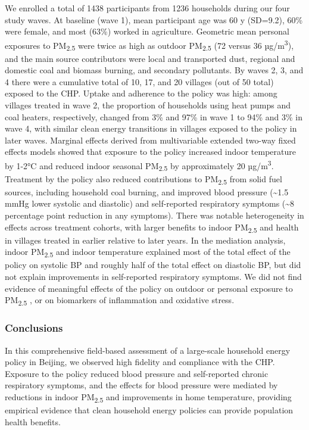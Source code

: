 \documentclass[
  letterpaper,
  DIV=11,
  numbers=noendperiod]{scrartcl}
\begin{document}
We enrolled a total of 1438 participants from 1236 households during our
four study waves. At baseline (wave 1), mean participant age was 60 y
(SD=9.2), 60\% were female, and most (63\%) worked in agriculture.
Geometric mean personal exposures to PM\textsubscript{2.5} were twice as
high as outdoor PM\textsubscript{2.5} (72 versus 36
µg/m\textsuperscript{3}), and the main source contributors were local
and transported dust, regional and domestic coal and biomass burning,
and secondary pollutants. By waves 2, 3, and 4 there were a cumulative
total of 10, 17, and 20 villages (out of 50 total) exposed to the CHP.
Uptake and adherence to the policy was high: among villages treated in
wave 2, the proportion of households using heat pumps and coal heaters,
respectively, changed from 3\% and 97\% in wave 1 to 94\% and 3\% in
wave 4, with similar clean energy transitions in villages exposed to the
policy in later waves. Marginal effects derived from multivariable
extended two-way fixed effects models showed that exposure to the policy
increased indoor temperature by 1-2°C and reduced indoor seasonal
PM\textsubscript{2.5} by approximately 20 µg/m\textsuperscript{3}.
Treatment by the policy also reduced contributions to
PM\textsubscript{2.5} from solid fuel sources, including household coal
burning, and improved blood pressure (\textasciitilde1.5 mmHg lower
systolic and diastolic) and self-reported respiratory symptoms
(\textasciitilde8 percentage point reduction in any symptoms). There was
notable heterogeneity in effects across treatment cohorts, with larger
benefits to indoor PM\textsubscript{2.5} and health in villages treated
in earlier relative to later years. In the mediation analysis, indoor
PM\textsubscript{2.5} and indoor temperature explained most of the total
effect of the policy on systolic BP and roughly half of the total effect
on diastolic BP, but did not explain improvements in self-reported
respiratory symptoms. We did not find evidence of meaningful effects of
the policy on outdoor or personal exposure to PM\textsubscript{2.5} , or
on biomarkers of inflammation and oxidative stress.

\subsubsection*{Conclusions}\label{conclusions}

In this comprehensive field-based assessment of a large-scale household
energy policy in Beijing, we observed high fidelity and compliance with
the CHP. Exposure to the policy reduced blood pressure and self-reported
chronic respiratory symptoms, and the effects for blood pressure were
mediated by reductions in indoor PM\textsubscript{2.5} and improvements
in home temperature, providing empirical evidence that clean household
energy policies can provide population health benefits.
\end{document}
